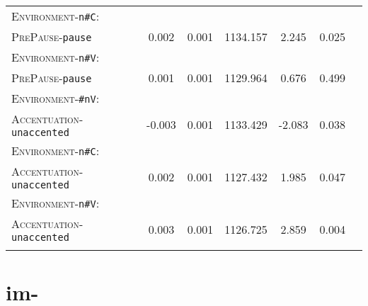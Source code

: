 \begin{table}[H]
{\begin{tabular}{lSSSSSS}
		\textsc{Environment}-\texttt{n\#C}:&&&&&\\
		\textsc{PrePause}-\texttt{pause} & 0.002 & 0.001 & 1134.157 & 2.245 & 0.025 \\ 
		
		\textsc{Environment}-\texttt{n\#V}:&&&&&\\
		\textsc{PrePause}-\texttt{pause} & \color{lsLightGray} 0.001 & \color{lsLightGray} 0.001 & \color{lsLightGray} 1129.964 & \color{lsLightGray} 0.676 & \color{lsLightGray} 0.499 \\ 
		
		\textsc{Environment}-\texttt{\#nV}:&&&&&\\
		\textsc{Accentuation}-\texttt{unaccented} & -0.003 & 0.001 & 1133.429 & -2.083 & 0.038 \\ 
		
		\textsc{Environment}-\texttt{n\#C}:&&&&&\\
		\textsc{Accentuation}-\texttt{unaccented} & 0.002 & 0.001 & 1127.432 & 1.985 & 0.047 \\ 
		
		\textsc{Environment}-\texttt{n\#V}:&&&&&\\
		\textsc{Accentuation}-\texttt{unaccented} & 0.003 & 0.001 & 1126.725 & 2.859 & 0.004 \\ 
		\lspbottomrule 
			\end{tabular}}
\end{table}


\section{{im-}}

